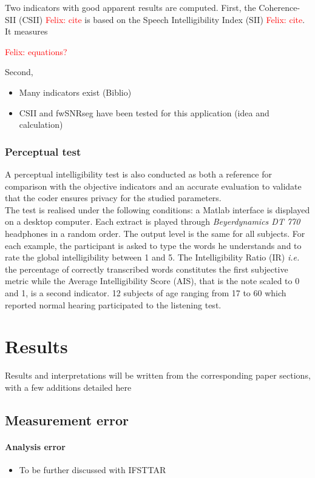 \documentclass[12pt,times,onecolumn]{article}
\newcommand{\fg}[1]{\textcolor{red}{ Felix: #1}}
\begin{document}
Two indicators with good apparent results are computed. First, the Coherence-SII (CSII) \fg{cite} is based on the Speech Intelligibility Index (SII) \fg{cite}. It measures 

\fg{equations?}

Second, 

\begin{itemize}
\item Many indicators exist (Biblio)
\item CSII and fwSNRseg have been tested for this application (idea and calculation)
\end{itemize}


\subsubsection{Perceptual test}
A perceptual intelligibility test is also conducted as both a reference for comparison with the objective indicators and an accurate evaluation to validate that the coder ensures privacy for the studied parameters.\\

The test is realised under the following conditions: a Matlab interface is displayed on a desktop computer. Each extract is played through \textit{Beyerdynamics DT 770} headphones in a random order. The output level is the same for all subjects. For each example, the participant is asked to type the words he understands and to rate the global intelligibility between 1 and 5. The Intelligibility Ratio (IR) \textit{i.e.} the percentage of correctly transcribed words constitutes the first subjective metric while the Average Intelligibility Score (AIS), that is the note scaled to 0 and 1, is a second indicator. 12 subjects of age ranging from 17 to 60 which reported normal hearing participated to the listening test.


\section{Results}
Results and interpretations will be written from the corresponding paper sections, with a few additions detailed here
\subsection{Measurement error}
\paragraph{Analysis error}
\begin{itemize}
\item To be further discussed with IFSTTAR
\end{itemize}
\end{document}
